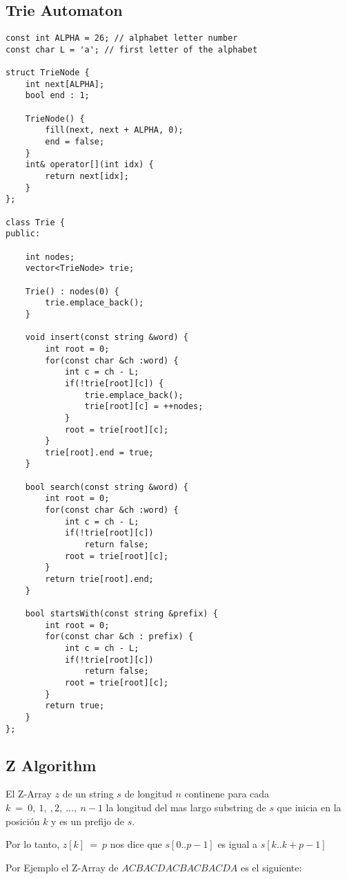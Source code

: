 \documentclass[10pt,letterpaper,twocolumn,twosided]{article}
\begin{document}
\subsection{Trie Automaton}
\begin{lstlisting}
const int ALPHA = 26; // alphabet letter number
const char L = 'a'; // first letter of the alphabet

struct TrieNode {
    int next[ALPHA];
    bool end : 1;
    
    TrieNode() {
        fill(next, next + ALPHA, 0);
        end = false;
    }
    int& operator[](int idx) {
        return next[idx];
    }
};

class Trie {
public:
    
    int nodes;
    vector<TrieNode> trie;

    Trie() : nodes(0) {
        trie.emplace_back();
    }
    
    void insert(const string &word) {
        int root = 0;
        for(const char &ch :word) {
            int c = ch - L;
            if(!trie[root][c]) {
                trie.emplace_back();
                trie[root][c] = ++nodes;
            }
            root = trie[root][c];
        }
        trie[root].end = true;
    }
    
    bool search(const string &word) {
        int root = 0;
        for(const char &ch :word) {
            int c = ch - L;
            if(!trie[root][c])
                return false;
            root = trie[root][c];
        }
        return trie[root].end;
    }
    
    bool startsWith(const string &prefix) {
        int root = 0;
        for(const char &ch : prefix) {
            int c = ch - L;
            if(!trie[root][c])
                return false;
            root = trie[root][c];
        }
        return true;
    }
};
\end{lstlisting}

\subsection{Z Algorithm}

El Z-Array $z$ de un string $s$ de longitud $n$ continene para cada $k\:=\:0, \:1, \:, 2, \:…,\:n-1$ la longitud del mas largo substring de $s$ que inicia en la posición $k$ y es un prefijo de $s$.

Por lo tanto, $z[k]\:=\:p$ nos dice que $s\left[0..p-1\right]$ es igual a $s\left[k..k+p-1\right]$

Por Ejemplo el Z-Array de $ACBACDACBACBACDA$ es el siguiente:
\end{document}

